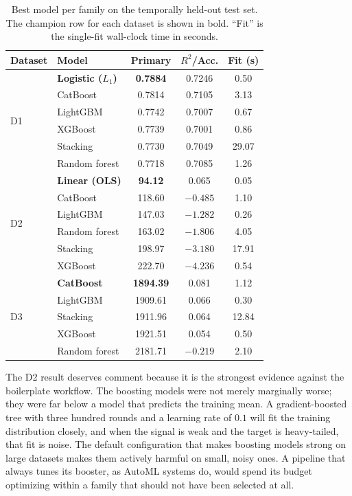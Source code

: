 \documentclass{ieeeaccess}
\begin{document}
\begin{table}[t]
\caption{Best model per family on the temporally held-out test set. The champion row for each dataset is shown in bold. ``Fit'' is the single-fit wall-clock time in seconds.}
\label{tab:leaderboard}
\centering
\footnotesize
\setlength{\tabcolsep}{3pt}
\begin{tabular}{llccc}
\toprule
Dataset & Model & Primary & $R^2$/Acc. & Fit (s) \\
\midrule
\multirow{6}{*}{D1} & \textbf{Logistic ($L_1$)} & \textbf{0.7884} & 0.7246 & 0.50 \\
 & CatBoost & 0.7814 & 0.7105 & 3.13 \\
 & LightGBM & 0.7742 & 0.7007 & 0.67 \\
 & XGBoost & 0.7739 & 0.7001 & 0.86 \\
 & Stacking & 0.7730 & 0.7049 & 29.07 \\
 & Random forest & 0.7718 & 0.7085 & 1.26 \\
\midrule
\multirow{6}{*}{D2} & \textbf{Linear (OLS)} & \textbf{94.12} & 0.065 & 0.05 \\
 & CatBoost & 118.60 & $-0.485$ & 1.10 \\
 & LightGBM & 147.03 & $-1.282$ & 0.26 \\
 & Random forest & 163.02 & $-1.806$ & 4.05 \\
 & Stacking & 198.97 & $-3.180$ & 17.91 \\
 & XGBoost & 222.70 & $-4.236$ & 0.54 \\
\midrule
\multirow{5}{*}{D3} & \textbf{CatBoost} & \textbf{1894.39} & 0.081 & 1.12 \\
 & LightGBM & 1909.61 & 0.066 & 0.30 \\
 & Stacking & 1911.96 & 0.064 & 12.84 \\
 & XGBoost & 1921.51 & 0.054 & 0.50 \\
 & Random forest & 2181.71 & $-0.219$ & 2.10 \\
\bottomrule
\end{tabular}
\end{table}

The D2 result deserves comment because it is the strongest evidence against the boilerplate workflow. The boosting models were not merely marginally worse; they were far below a model that predicts the training mean. A gradient-boosted tree with three hundred rounds and a learning rate of $0.1$ will fit the training distribution closely, and when the signal is weak and the target is heavy-tailed, that fit is noise. The default configuration that makes boosting models strong on large datasets makes them actively harmful on small, noisy ones. A pipeline that always tunes its booster, as AutoML systems do, would spend its budget optimizing within a family that should not have been selected at all.
\end{document}
